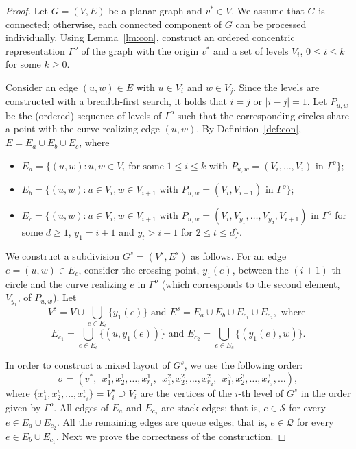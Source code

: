 \documentclass[orivec]{llncs}
\newcommand{\Sh}{{\ensuremath{\mathcal{S}}}}
\newcommand{\Qh}{{\ensuremath{\mathcal{Q}}}}
\begin{document}
\begin{proof}
    Let $G = (V, E)$ be a planar graph and $v^* \in V$. We assume that $G$ is connected; otherwise, 
    each connected component of $G$ can be processed individually.
    Using Lemma~\ref{lm:con}, construct an ordered 
    concentric representation $\Gamma^o$ of 
    the graph with the origin $v^*$ and a set of levels $V_i$, $0 \le i \le k$ for some 
    $k \ge 0$.
    
    Consider an edge $(u, w) \in E$ with $u \in V_i$ and $w \in V_j$. Since the levels are constructed
    with a breadth-first search, it holds that $i=j$ or $|i-j|=1$. 
    Let $P_{u,w}$ be the (ordered) sequence of levels 
    of $\Gamma^o$ such that the corresponding circles share a point with the curve realizing edge $(u, w)$. 
    By Definition~\ref{def:con}, $E = E_a \cup E_b \cup E_c$, where
    \begin{itemize}
        \item $E_a = \{(u, w) : u, w \in V_i \text { for some } 1 \le i \le k$ with $P_{u,w}=(V_i, \dots, V_i)$ in $\Gamma^o \}$;
        \item $E_b = \{(u, w) : u \in V_i, w \in V_{i+1}$ with $P_{u,w}=(V_i, V_{i+1})$ in $\Gamma^o \}$;
        \item $E_c = \{(u, w) : u \in V_i, w \in V_{i+1}$ with $P_{u,w}=(V_i, V_{y_1}, \dots, V_{y_d}, V_{i+1})$ in $\Gamma^o$ 
        for some $d \ge 1$, $y_1 = i+1$ and $y_t > i+1$ for $2 \le t \le d \}$.
    \end{itemize}

    We construct a subdivision $G^s=(V^s, E^s)$ as follows. For an edge $e=(u, w) \in E_c$, 
    consider the crossing point, $y_1(e)$, between the $(i+1)$-th circle and the curve realizing $e$ in $\Gamma^o$
    (which corresponds to the second element, $V_{y_1}$, of $P_{u, w}$).
    Let $$V^s = V \cup \bigcup_{e \in E_c} \{y_1(e)\} \text{ and } E^s = E_a \cup E_b \cup E_{c_1} \cup E_{c_2}, \text{ where }$$
    $$E_{c_1} = \bigcup_{e \in E_c} \{(u, y_1(e))\} \text{ and }
    E_{c_2} = \bigcup_{e \in E_c} \{(y_1(e), w)\}.$$
    
    
    In order to construct a mixed layout of $G^s$, we use the following order:
    $$
        \sigma = (v^*,~~ x_1^1, x_2^1, \dots, x_{r_1}^1,~~ x_1^2, x_2^2, \dots, x_{r_2}^2,~~ x_1^3, x_2^3, \dots, x_{r_3}^3, \dots),
    $$
    where $\{x_1^i, x_2^i, \dots, x_{r_i}^i\} = V_i^s \supseteq V_i$ are the vertices of the $i$-th level of $G^s$ 
    in the order given by $\Gamma^o$.
    All edges of $E_a$ and $E_{c_2}$ are stack edges; that is, $e \in \Sh$ for every $e \in E_a \cup E_{c_2}$.
    All the remaining edges are queue edges; that is, $e \in \Qh$ for every $e \in E_b \cup E_{c_1}$. Next we prove
    the correctness of the construction.
    

\end{proof}
\end{document}
